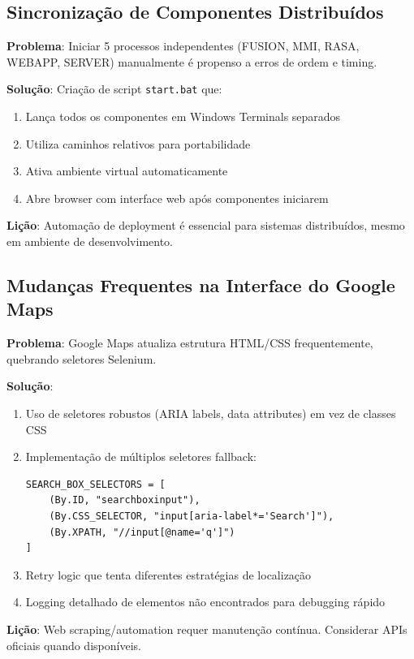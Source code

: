\subsection{Sincronização de Componentes Distribuídos}

\textbf{Problema}: Iniciar 5 processos independentes (FUSION, MMI, RASA, WEBAPP, SERVER) manualmente é propenso a erros de ordem e timing.

\textbf{Solução}: Criação de script \texttt{start.bat} que:
\begin{enumerate}
    \item Lança todos os componentes em Windows Terminals separados
    \item Utiliza caminhos relativos para portabilidade
    \item Ativa ambiente virtual automaticamente
    \item Abre browser com interface web após componentes iniciarem
\end{enumerate}

\textbf{Lição}: Automação de deployment é essencial para sistemas distribuídos, mesmo em ambiente de desenvolvimento.

\subsection{Mudanças Frequentes na Interface do Google Maps}

\textbf{Problema}: Google Maps atualiza estrutura HTML/CSS frequentemente, quebrando seletores Selenium.

\textbf{Solução}:
\begin{enumerate}
    \item Uso de seletores robustos (ARIA labels, data attributes) em vez de classes CSS
    \item Implementação de múltiplos seletores fallback:
    \begin{verbatim}
SEARCH_BOX_SELECTORS = [
    (By.ID, "searchboxinput"),
    (By.CSS_SELECTOR, "input[aria-label*='Search']"),
    (By.XPATH, "//input[@name='q']")
]
    \end{verbatim}
    \item Retry logic que tenta diferentes estratégias de localização
    \item Logging detalhado de elementos não encontrados para debugging rápido
\end{enumerate}

\textbf{Lição}: Web scraping/automation requer manutenção contínua. Considerar APIs oficiais quando disponíveis.

